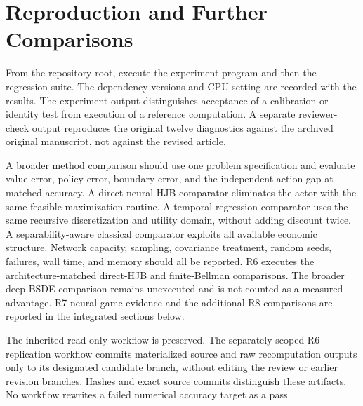 \documentclass[ecta,nameyear,draft]{econsocart}
\theoremstyle{definition}
\theoremstyle{remark}
\begin{document}
\section{Reproduction and Further Comparisons}
From the repository root, execute the experiment program and then the regression suite. The dependency versions and CPU setting are recorded with the results. The experiment output distinguishes acceptance of a calibration or identity test from execution of a reference computation. A separate reviewer-check output reproduces the original twelve diagnostics against the archived original manuscript, not against the revised article.

A broader method comparison should use one problem specification and evaluate value error, policy error, boundary error, and the independent action gap at matched accuracy. A direct neural-HJB comparator eliminates the actor with the same feasible maximization routine. A temporal-regression comparator uses the same recursive discretization and utility domain, without adding discount twice. A separability-aware classical comparator exploits all available economic structure. Network capacity, sampling, covariance treatment, random seeds, failures, wall time, and memory should all be reported. R6 executes the architecture-matched direct-HJB and finite-Bellman comparisons. The broader deep-BSDE comparison remains unexecuted and is not counted as a measured advantage. R7 neural-game evidence and the additional R8 comparisons are reported in the integrated sections below.

The inherited read-only workflow is preserved. The separately scoped R6 replication workflow commits materialized source and raw recomputation outputs only to its designated candidate branch, without editing the review or earlier revision branches. Hashes and exact source commits distinguish these artifacts. No workflow rewrites a failed numerical accuracy target as a pass.










\end{document}

